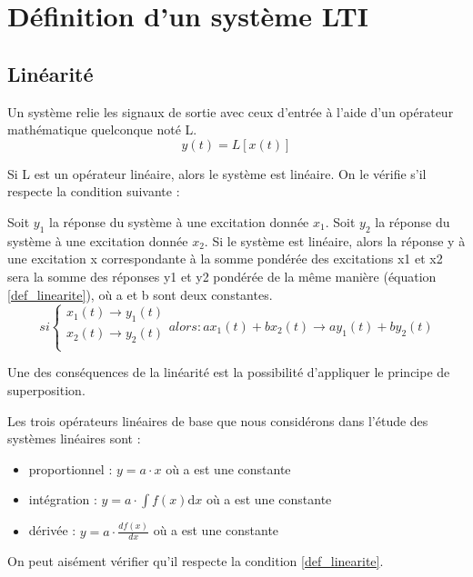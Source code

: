 \documentclass[]{report}
\newcommand{\deriv}{\mathrm{d}}
\begin{document}
	
	\section{Définition d'un système LTI}

	\subsection{Linéarité} 
	Un système relie les signaux de sortie avec ceux d'entrée à l'aide d'un opérateur mathématique quelconque noté L.
	\begin{equation}\label{key}
	y(t) = L[x(t)] 
	\end{equation}
		
	Si L est un opérateur linéaire, alors le système est linéaire. On le vérifie s'il respecte la condition suivante : 
	
	Soit $y_{1}$ la réponse du système à une excitation donnée $x_{1}$. Soit $y_{2}$ la réponse du système à une excitation donnée $x_{2}$. Si le système est linéaire, alors la réponse y à une excitation x correspondante à la somme pondérée des excitations x1 et x2 sera la somme des réponses y1 et y2 pondérée de la même manière (équation \ref{def_linearite}), où a et b sont deux constantes.
	\begin{equation}\label{def_linearite}
	si    \left \{
	\begin{array}{l}
	x_{1}(t)\rightarrow y_{1}(t)  \\
	x_{2}(t)\rightarrow y_{2}(t)   \\
	\end{array}
	\right . alors: ax_{1}(t)+bx_{2}(t)\rightarrow ay_{1}(t)+by_{2}(t)
	\end{equation}
	
	
	Une des conséquences de la linéarité est la possibilité d'appliquer le principe de superposition.
	
	Les trois opérateurs linéaires de base que nous considérons dans l'étude des systèmes linéaires sont :
	\begin{itemize}
		\item proportionnel : $y = a\cdot x$ où a est une constante 
		\item intégration : $y = a\cdot \int f(x) \deriv x $ où a est une constante
		\item dérivée : $y = a\cdot \frac{df(x)}{dx} $ où a est une constante
	\end{itemize}
	On peut aisément vérifier qu'il respecte la condition \ref{def_linearite}.
	
\end{document}
